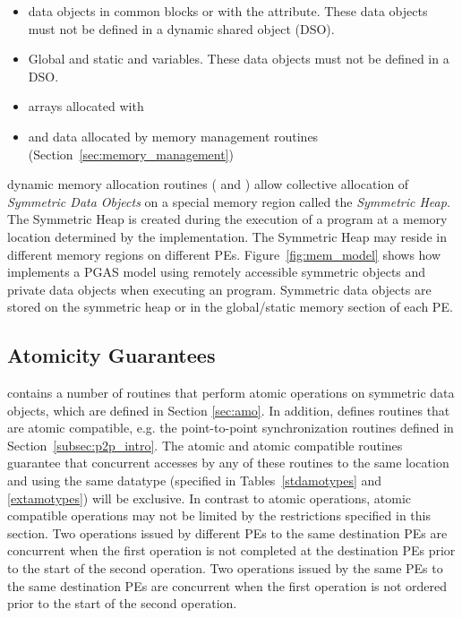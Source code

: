 \begin{itemize}
\item
  \begin{deprecate}
    \Fortran data objects in common blocks or with the  attribute.
    These data objects must not be defined in a dynamic shared object (DSO).
  \end{deprecate}
\item Global and static \Cstd and \Cpp variables. These data objects must
  not  be defined in a DSO.
\item
  \begin{deprecate}
    \Fortran arrays allocated with 
  \end{deprecate}
\item \Cstd and \Cpp data allocated by \openshmem memory management routines
  (Section~\ref{sec:memory_management})
\end{itemize}       

\openshmem dynamic memory allocation routines ( and
) allow collective allocation of \emph{Symmetric Data
Objects} on a special memory region called the \emph{Symmetric Heap}. The
Symmetric Heap is created during the execution of a program at a memory location
determined by the implementation. The Symmetric Heap may reside in different
memory regions on different \acp{PE}. Figure~\ref{fig:mem_model} shows how
\openshmem implements a \ac{PGAS} model using remotely accessible symmetric
objects and private data objects when executing an \openshmem program.
Symmetric data objects are stored on the symmetric heap or in the global/static
memory section of each \ac{PE}. 

\subsection{Atomicity Guarantees}\label{subsec:amo_guarantees}

\openshmem contains a number of routines that perform atomic operations on
symmetric data objects, which are defined in Section \ref{sec:amo}.  In
addition, \openshmem defines routines that are atomic compatible, e.g. the
point-to-point synchronization routines defined in
Section~\ref{subsec:p2p_intro}.  The atomic and atomic compatible routines
guarantee that concurrent accesses by any of these routines to the same
location and using the same datatype (specified in Tables~\ref{stdamotypes} and
\ref{extamotypes}) will be exclusive.  In contrast to atomic operations, atomic
compatible operations may not be limited by the restrictions specified in this
section.  Two operations issued by different \acp{PE} to the same destination
\acp{PE} are concurrent when the first operation is not completed at the
destination \acp{PE} prior to the start of the second operation.  Two
operations issued by the same \acp{PE} to the same destination \acp{PE} are
concurrent when the first operation is not ordered prior to the start of the
second operation.

